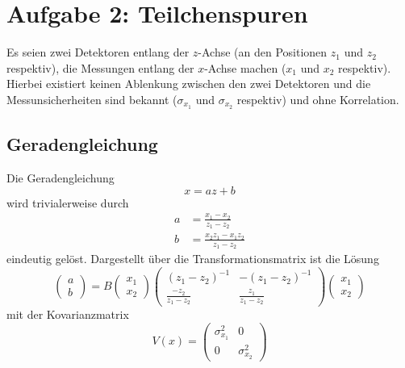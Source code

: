 \section*{Aufgabe 2: Teilchenspuren}
\label{sec:Aufgabe2}
Es seien zwei Detektoren entlang der $z$-Achse (an den Positionen $z_1$ und $z_2$ respektiv), die Messungen entlang der $x$-Achse machen ($x_1$ und $x_2$ respektiv).
Hierbei existiert keinen Ablenkung zwischen den zwei Detektoren und die Messunsicherheiten sind bekannt ($\sigma_{x_1}$ und $\sigma_{x_2}$ respektiv) und ohne Korrelation.

\subsection*{Geradengleichung}
\label{sub:Geradengleichung}
Die Geradengleichung
\begin{equation}
    x=az+b\label{eqn:Geradengleichung}
\end{equation}
wird trivialerweise durch
\begin{align}
    a&=\frac{x_1-x_2}{z_1-z_2}\nonumber\\
    b&=\frac{x_2 z_1 - x_1 z_2}{z_1-z_2}
\end{align}
eindeutig gelöst.
Dargestellt über die Transformationsmatrix ist die Lösung
\begin{equation}
    \left(
        \begin{array}{r}
            a\\
            b
        \end{array}
    \right)
    = B \left(
            \begin{array}{r}
                x_1\\
                x_2
            \end{array}
        \right)
    \left(
        \begin{array}{rr}
            (z_1-z_2)^{-1}          & -(z_1-z_2)^{-1}\\
            \frac{-z_2}{z_1-z_2}    & \frac{z_1}{z_1-z_2}
        \end{array}
    \right)
    \left(
        \begin{array}{r}
        x_1\\
        x_2
        \end{array}
    \right)
\end{equation}
mit der Kovarianzmatrix
\begin{equation}
    V(x)=
    \left(
        \begin{array}{rr}
            \sigma_{x_1}^2 & 0\\
            0 & \sigma_{x_2}^2
        \end{array}
    \right)
\end{equation}
